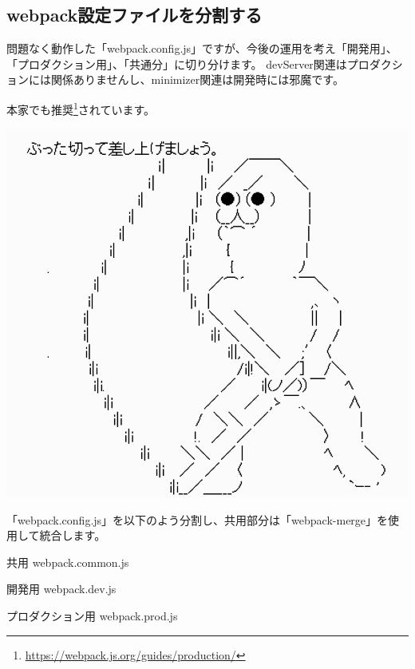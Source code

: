\subsection{webpack設定ファイルを分割する}
\keeplastskip{
  \label{sec:2-2-5}
  \label{sec-04-webpack-config-all}
  \par\nobreak
}

問題なく動作した「webpack.config.js」ですが、今後の運用を考え「開発用」、「プロダクション用」、「共通分」に切り分けます。
devServer関連はプロダクションには関係ありませんし、minimizer関連は開発時には邪魔です。

本家でも推奨\footnote{\url{https://webpack.js.org/guides/production/}}されています。

\begin{reviewimage}[H]%
\includegraphics[width=0.7\maxwidth]{./images/02-create-react-app/divid.png}%
\label{image:02-create-react-app:divid}
\end{reviewimage}
\vspace*{\baselineskip}

「webpack.config.js」を以下のよう分割し、共用部分は「webpack{-}merge」を使用して統合します。\\[0pt]

\begin{starteritemize}
\item 共用 webpack.common.js
\item 開発用 webpack.dev.js
\item プロダクション用 webpack.prod.js
\end{starteritemize}

